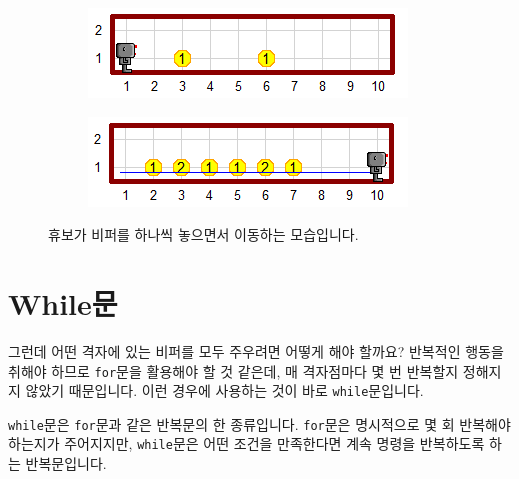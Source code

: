 \documentclass[../main.tex]{subfiles}
\begin{document}
\begin{figure}[htbp]
\centering
\begin{subfigure}{.5\textwidth}
\centering
\includegraphics[width=.9\linewidth]{"./lectures/lecture5_pickbeeperbef"}
\end{subfigure}%
\begin{subfigure}{.5\textwidth}
\centering
\includegraphics[width=.9\linewidth]{"./lectures/lecture5_putbeeperaft"}
\end{subfigure}
\caption{휴보가 비퍼를 하나씩 놓으면서 이동하는 모습입니다.}\label{fig:lecture5putbeeper}
\end{figure}

\section{While문}
그런데 어떤 격자에 있는 비퍼를 모두 주우려면 어떻게 해야 할까요?
반복적인 행동을 취해야 하므로 \texttt{for}문을 활용해야 할 것 같은데, 매 격자점마다 몇 번 반복할지 정해지지 않았기 때문입니다.
이런 경우에 사용하는 것이 바로 \texttt{while}문입니다.

\texttt{while}문은 \texttt{for}문과 같은 반복문의 한 종류입니다.
\texttt{for}문은 명시적으로 몇 회 반복해야 하는지가 주어지지만, \texttt{while}문은 어떤 조건을 만족한다면 계속 명령을 반복하도록 하는 반복문입니다.

\end{document}
